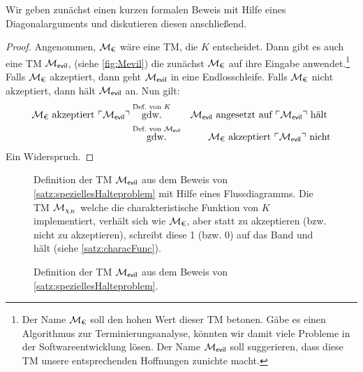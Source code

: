 Wir geben zunächst einen kurzen formalen Beweis mit Hilfe eines Diagonalarguments
und diskutieren diesen anschließend.
\begin{proof}
	Angenommen, $\mathcal{M}_\text{€}$ wäre eine \ac{TM}, die $K$ entscheidet.
	Dann gibt es auch eine \ac{TM} $\mathcal{M}_\textsf{evil}$, (siehe \autoref{fig:Mevil})
	die zunächst $\mathcal{M}_\text{€}$ auf ihre Eingabe anwendet.\footnote{
		Der Name $\mathcal{M}_\text{€}$ soll den hohen Wert dieser \ac{TM} betonen.
		Gäbe es einen Algorithmus zur Terminierungsanalyse, könnten wir damit viele Probleme in der Softwareentwicklung lösen.
		Der Name $\mathcal{M}_\textsf{evil}$ soll suggerieren, dass diese \ac{TM} unsere entsprechenden Hoffnungen zunichte macht.
	}
	Falls $\mathcal{M}_\text{€}$ akzeptiert, dann geht $\mathcal{M}_\textsf{evil}$ in eine Endlosschleife. 
	Falls $\mathcal{M}_\text{€}$ nicht akzeptiert, dann hält $\mathcal{M}_\textsf{evil}$ an. Nun gilt:
	\begin{eqnarray*}
		\mathcal{M}_\text{€} \text{ akzeptiert } \ulcorner \mathcal{M}_\textsf{evil} \urcorner 
		&\stackrel{\text{Def.\ von } K}{\text{gdw.}} & \mathcal{M}_\textsf{evil} \text{ angesetzt auf } \ulcorner \mathcal{M}_\textsf{evil} \urcorner \text{ hält }\\
		&\stackrel{\text{Def.\ von } \mathcal{M}_\textsf{evil}}{\text{gdw.}} & \mathcal{M}_\text{€} \text{ akzeptiert } \ulcorner \mathcal{M}_\textsf{evil} \urcorner \text{ nicht}
	\end{eqnarray*}
	Ein Widerspruch.
\end{proof}

\begin{figure}[H]\centering
	
	\parbox{102mm}{
		Definition der \ac{TM} $\mathcal{M}_\textsf{evil}$ aus dem Beweis von \autoref{satz:speziellesHalteproblem} mit Hilfe eines Flussdiagramms.
		Die \ac{TM} $\mathcal{M}_{\chi_K}$ welche die charakteristische Funktion von $K$ implementiert, verhält sich wie $\mathcal{M}_\text{€}$, aber statt zu akzeptieren (bzw. nicht zu akzeptieren), schreibt diese 1 (bzw. 0) auf das Band und hält (siehe \autoref{satz:characFunc}).
	}
	
	
	\caption{Definition der \ac{TM} $\mathcal{M}_\textsf{evil}$ aus dem Beweis von \autoref{satz:speziellesHalteproblem}.}
	\label{fig:Mevil}
\end{figure}



